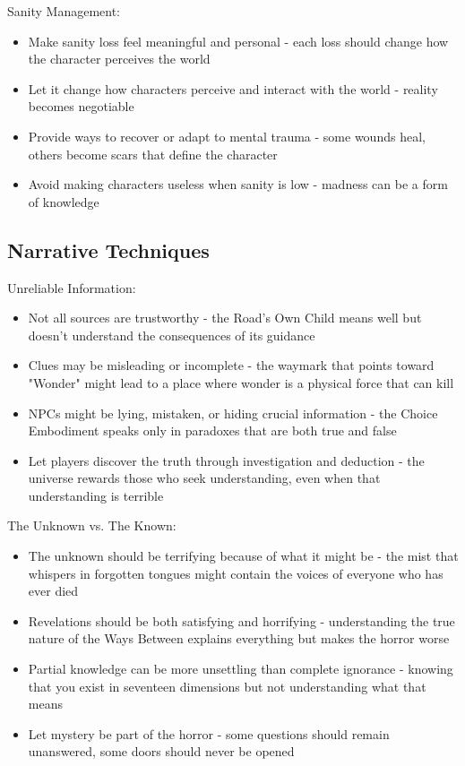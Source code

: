\documentclass[11pt]{article}
\begin{document}
Sanity Management:
\begin{itemize}
\item Make sanity loss feel meaningful and personal - each loss should change how the character perceives the world
\item Let it change how characters perceive and interact with the world - reality becomes negotiable
\item Provide ways to recover or adapt to mental trauma - some wounds heal, others become scars that define the character
\item Avoid making characters useless when sanity is low - madness can be a form of knowledge
\end{itemize}

\subsection{Narrative Techniques}

Unreliable Information:
\begin{itemize}
\item Not all sources are trustworthy - the Road's Own Child means well but doesn't understand the consequences of its guidance
\item Clues may be misleading or incomplete - the waymark that points toward "Wonder" might lead to a place where wonder is a physical force that can kill
\item NPCs might be lying, mistaken, or hiding crucial information - the Choice Embodiment speaks only in paradoxes that are both true and false
\item Let players discover the truth through investigation and deduction - the universe rewards those who seek understanding, even when that understanding is terrible
\end{itemize}

The Unknown vs. The Known:
\begin{itemize}
\item The unknown should be terrifying because of what it might be - the mist that whispers in forgotten tongues might contain the voices of everyone who has ever died
\item Revelations should be both satisfying and horrifying - understanding the true nature of the Ways Between explains everything but makes the horror worse
\item Partial knowledge can be more unsettling than complete ignorance - knowing that you exist in seventeen dimensions but not understanding what that means
\item Let mystery be part of the horror - some questions should remain unanswered, some doors should never be opened
\end{itemize}
\end{document}

